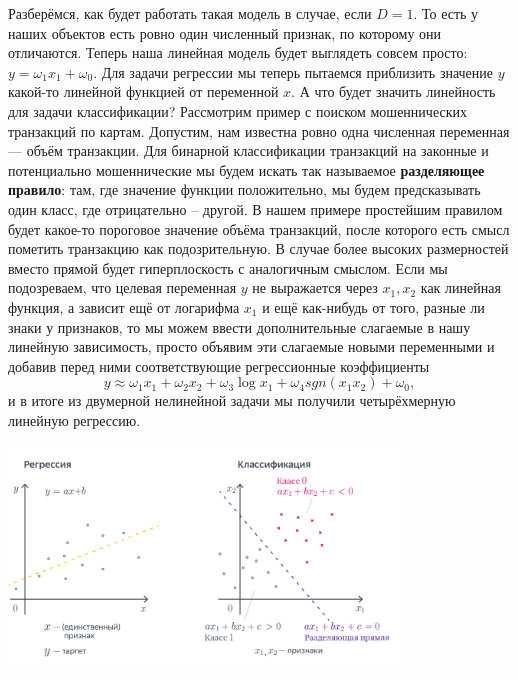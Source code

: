Разберёмся, как будет работать такая модель в случае, если $D=1$. То есть у наших объектов есть ровно один численный признак, по которому они отличаются. Теперь наша линейная модель будет выглядеть совсем просто: $y=\omega_1x_1+\omega_0$. Для задачи регрессии мы теперь пытаемся приблизить значение $y$ какой-то линейной функцией от переменной $x$. А что будет значить линейность для задачи классификации? Рассмотрим пример с поиском мошеннических транзакций по картам. Допустим, нам известна ровно одна численная переменная — объём транзакции. Для бинарной классификации транзакций на законные и потенциально мошеннические мы будем искать так называемое \textbf{разделяющее правило}: там, где значение функции положительно, мы будем предсказывать один класс, где отрицательно – другой. В нашем примере простейшим правилом будет какое-то пороговое значение объёма транзакций, после которого есть смысл пометить транзакцию как подозрительную. В случае более высоких размерностей вместо прямой будет гиперплоскость с аналогичным смыслом.  Если мы подозреваем, что целевая переменная $y$ не выражается через $x_1, x_2$ как линейная функция, а зависит ещё от логарифма $x_1$ и ещё как-нибудь от того, разные ли знаки у признаков, то мы можем ввести дополнительные слагаемые в нашу линейную зависимость, просто объявим эти слагаемые новыми переменными и добавив перед ними соответствующие регрессионные коэффициенты
\begin{equation*}
    y \approx \omega_1x_1+\omega_2x_2+\omega_3\log{x_1}+\omega_4sgn(x_1x_2)+\omega_0,
\end{equation*}
и в итоге из двумерной нелинейной задачи мы получили четырёхмерную линейную регрессию.
\begin{center}
    \includegraphics[height=6cm]{pics/t_osn24_linear_models.png}
\end{center}

